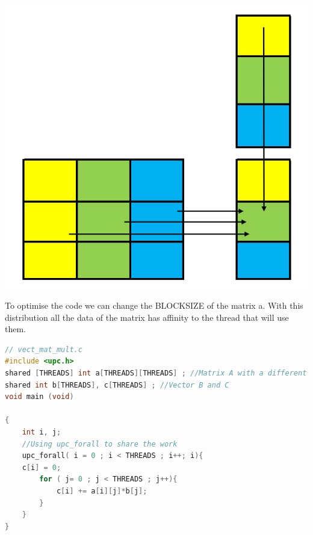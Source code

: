 \documentclass{report}
\begin{document}
\begin{center}
    \includegraphics[scale=0.5]{Images/Matrix_vector_unoptimized.png}
    \label{fig1}
\end{center}

To optimise the code we can change the BLOCKSIZE of the matrix a. With this distribution all the data of the matrix has affinity to the thread that will use them.

\begin{lstlisting}[language=C]
// vect_mat_mult.c
#include <upc.h>
shared [THREADS] int a[THREADS][THREADS] ; //Matrix A with a different blocksize
shared int b[THREADS], c[THREADS] ; //Vector B and C
void main (void) 

{
    int i, j; 
    //Using upc_forall to share the work
    upc_forall( i = 0 ; i < THREADS ; i++; i){
    c[i] = 0;
        for ( j= 0 ; j < THREADS ; j++){
            c[i] += a[i][j]*b[j];
        }
    }
}
\end{lstlisting}
\end{document}

